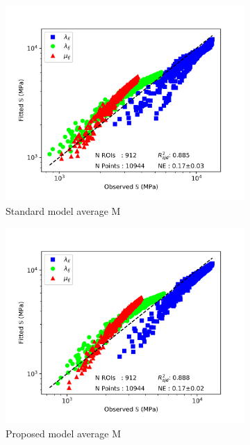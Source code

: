 \documentclass[a4paper,fleqn]{DC_ArtStyle}
\begin{document}
\begin{figure}[!h]
\begin{subfigure}[b]{0.45\linewidth}
			\includegraphics[width=\linewidth]{RegressionFabric_Isotropic_Mave}
			\caption{Standard model average M}
		\end{subfigure}
		\begin{subfigure}[b]{0.45\linewidth}
			\includegraphics[width=\linewidth]{RegressionFabricK_Isotropic_Mave}
			\caption{Proposed model average M}
		\end{subfigure}
		\begin{subfigure}[b]{0.45\linewidth}

\end{subfigure}
\end{figure}
\end{document}
